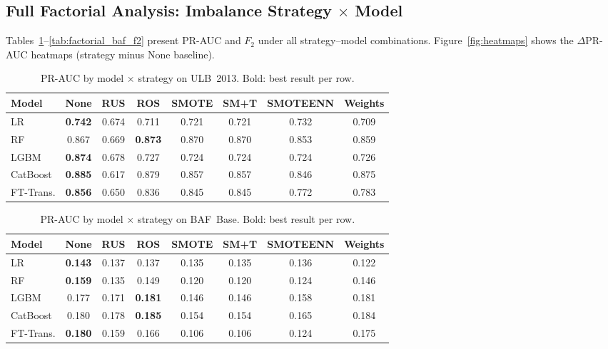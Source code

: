 \documentclass[a4paper,fleqn]{cas-sc}
\begin{document}
\subsection{Full Factorial Analysis: Imbalance Strategy \texorpdfstring{$\times$}{x} Model}
\label{subsec:factorial}

Tables~\ref{tab:factorial_ulb_prauc}--\ref{tab:factorial_baf_f2} present PR-AUC and $F_2$
under all strategy--model combinations.
Figure~\ref{fig:heatmaps} shows the $\Delta$PR-AUC heatmaps (strategy minus None baseline).

\begin{table}[ht!]
\centering
\caption{PR-AUC by model $\times$ strategy on ULB~2013. Bold: best result per row.}
\label{tab:factorial_ulb_prauc}
\begin{tabular}{l c c c c c c c}
\toprule
Model & None & RUS & ROS & SMOTE & SM+T & SMOTEENN & Weights \\
\midrule
LR         & \textbf{0.742} & 0.674 & 0.711 & 0.721 & 0.721 & 0.732 & 0.709 \\
RF         & 0.867 & 0.669 & \textbf{0.873} & 0.870 & 0.870 & 0.853 & 0.859 \\
LGBM       & \textbf{0.874} & 0.678 & 0.727 & 0.724 & 0.724 & 0.724 & 0.726 \\
CatBoost   & \textbf{0.885} & 0.617 & 0.879 & 0.857 & 0.857 & 0.846 & 0.875 \\
FT-Trans.  & \textbf{0.856} & 0.650 & 0.836 & 0.845 & 0.845 & 0.772 & 0.783 \\
\bottomrule
\end{tabular}
\end{table}

\begin{table}[ht!]
\centering
\caption{PR-AUC by model $\times$ strategy on BAF~Base. Bold: best result per row.}
\label{tab:factorial_baf_prauc}
\begin{tabular}{l c c c c c c c}
\toprule
Model & None & RUS & ROS & SMOTE & SM+T & SMOTEENN & Weights \\
\midrule
LR         & \textbf{0.143} & 0.137 & 0.137 & 0.135 & 0.135 & 0.136 & 0.122 \\
RF         & \textbf{0.159} & 0.135 & 0.149 & 0.120 & 0.120 & 0.124 & 0.146 \\
LGBM       & 0.177 & 0.171 & \textbf{0.181} & 0.146 & 0.146 & 0.158 & 0.181 \\
CatBoost   & 0.180 & 0.178 & \textbf{0.185} & 0.154 & 0.154 & 0.165 & 0.184 \\
FT-Trans.  & \textbf{0.180} & 0.159 & 0.166 & 0.106 & 0.106 & 0.124 & 0.175 \\
\bottomrule
\end{tabular}
\end{table}
\end{document}
